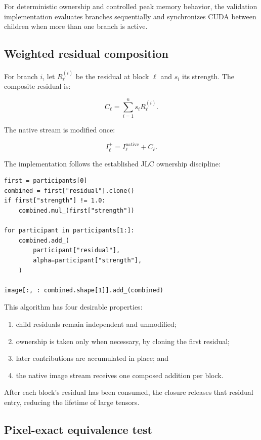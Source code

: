 \documentclass[11pt]{article}
\newcommand{\JLC}{\textsc{JLC}}
\begin{document}
For deterministic ownership and controlled peak memory behavior, the validation implementation evaluates branches sequentially and synchronizes CUDA between children when more than one branch is active.

\subsection{Weighted residual composition}

For branch $i$, let $R_{\ell}^{(i)}$ be the residual at block $\ell$ and $s_i$ its strength. The composite residual is:

\[
  C_{\ell} = \sum_{i=1}^{n} s_iR_{\ell}^{(i)}.
\]

The native stream is modified once:

\[
  I_{\ell}^{+} = I_{\ell}^{\mathrm{native}} + C_{\ell}.
\]

The implementation follows the established \JLC{} ownership discipline:

\begin{lstlisting}[style=pythonstyle,caption={Explicit non-recursive residual ownership and accumulation.}]
first = participants[0]
combined = first["residual"].clone()
if first["strength"] != 1.0:
    combined.mul_(first["strength"])

for participant in participants[1:]:
    combined.add_(
        participant["residual"],
        alpha=participant["strength"],
    )

image[:, : combined.shape[1]].add_(combined)
\end{lstlisting}

This algorithm has four desirable properties:

\begin{enumerate}
  \item child residuals remain independent and unmodified;
  \item ownership is taken only when necessary, by cloning the first residual;
  \item later contributions are accumulated in place; and
  \item the native image stream receives one composed addition per block.
\end{enumerate}

After each block's residual has been consumed, the closure releases that residual entry, reducing the lifetime of large tensors.

\subsection{Pixel-exact equivalence test}
\end{document}
